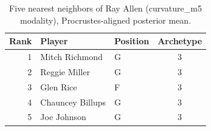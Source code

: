\begin{table}[htbp]
  \centering\small
  \begin{tabular}{rllc}
    \toprule
    Rank & Player & Position & Archetype \\
    \midrule
    1 & Mitch Richmond & G & 3 \\
    2 & Reggie Miller & G & 3 \\
    3 & Glen Rice & F & 3 \\
    4 & Chauncey Billups & G & 3 \\
    5 & Joe Johnson & G & 3 \\
    \bottomrule
  \end{tabular}
  \caption{Five nearest neighbors of Ray Allen (curvature_m5 modality), Procrustes-aligned posterior mean.}
  \label{tab:Ray_Allen_neighbors_curvature_m5}
\end{table}

